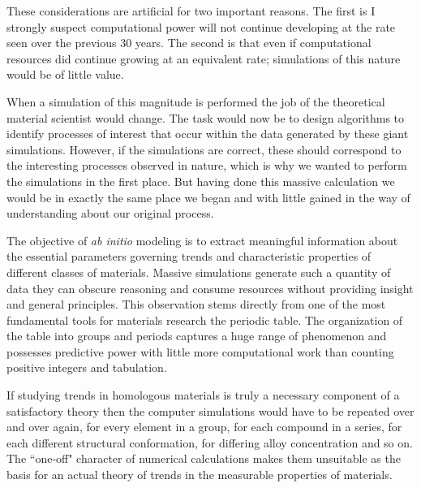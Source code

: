 These considerations are artificial for two important reasons. The first
is I strongly suspect computational power will not continue 
developing at the rate seen over the previous 30 years. 
The second is that even if computational resources did continue growing 
at an equivalent rate; simulations of this nature would be of little value.

When a simulation of this magnitude is performed the
job of the theoretical material scientist would change. 
The task would now be to design algorithms to identify 
processes of interest that occur within the data generated by these giant simulations.
However, if the simulations are correct, these should correspond 
to the interesting processes observed in nature, which is why we wanted to
perform the simulations in the first place. But having done 
this massive calculation we would be in exactly 
the same place we began and with little gained in the way 
of understanding about our original process.

The objective of {\it ab initio} modeling is to extract meaningful information
about the essential parameters governing trends and characteristic properties 
of different classes of materials. Massive simulations generate such a quantity 
of data they can obscure reasoning and consume resources without providing insight 
and general principles. This observation stems directly from one of the
most fundamental tools for materials research the periodic table. The 
organization of the table into groups and periods captures a huge range 
of phenomenon and possesses predictive power with little more computational
work than counting positive integers and tabulation.

If studying trends in homologous materials 
is truly a necessary component of a satisfactory
theory then the computer simulations would have to be repeated 
over and over again, for every element in a group,
for each compound in a series, for each different structural conformation,
for differing alloy concentration and so on. The ``one-off" character of 
numerical calculations makes them unsuitable as the basis for an actual 
theory of trends in the measurable properties of materials.



